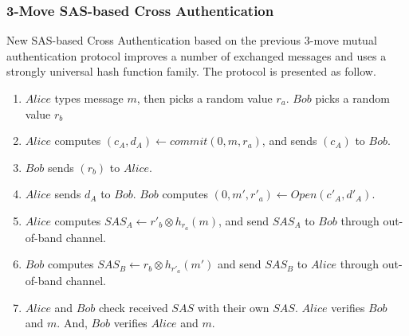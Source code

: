 \subsubsection*{3-Move SAS-based Cross Authentication}

New SAS-based Cross Authentication based on the previous 3-move mutual authentication protocol improves a number of exchanged messages and uses a strongly universal hash function family. The protocol is presented as follow. 
 
\begin{enumerate}
\item $Alice$ types message $m$, then picks a random value $r_a$. $Bob$  picks a random value $r_b$
\item $Alice$ computes $(c_A,d_A) \leftarrow commit(0,m,r_a)$, and sends $(c_A)$ to $Bob$.
\item $Bob$ sends $(r_b)$ to $Alice$.
\item $Alice$ sends $d_A$ to $Bob$. $Bob$ computes $(0,m',r'_a) \leftarrow Open(c'_A,d'_A)$. 
\item $Alice$ computes $SAS_A \leftarrow r'_b \otimes h_{r_a}(m)$, and send $SAS_A$ to $Bob$ through out-of-band channel. 
\item $Bob$ computes $SAS_B \leftarrow r_b \otimes h_{r'_a}(m')$ and send $SAS_B$ to $Alice$ through out-of-band channel. 
\item $Alice$ and $Bob$ check received $SAS$ with their own $SAS$. $Alice$ verifies $Bob$ and $m$. And, $Bob$ verifies $Alice$ and $m$.
\end{enumerate}

